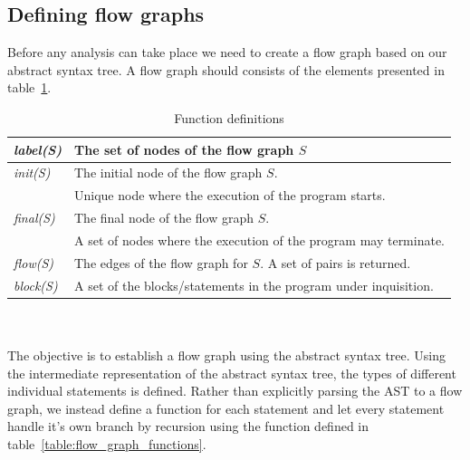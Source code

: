 \subsection{Defining flow graphs}\label{section:CreatingFlowGraphs}
Before any analysis can take place we need to create a flow graph based on our abstract syntax tree. A flow graph should consists of the elements presented in table~\ref{table:flow_graph_definitions}.
\begin{table}
    \begin{tabular}{l | l }
    \textsl{label(S)} & The set of nodes of the flow graph $S$ \\
    \hline    
    \textsl{init(S)}  & The initial node of the flow graph $S$.\\
               & Unique node where the execution of the program starts.\\
    \hline
    \textsl{final(S)}   & The final node of the flow graph $S$.\\
                 & A set of nodes where the execution of the program may terminate.\\
    \hline
    \textsl{flow(S)} & The edges of the flow graph for $S$. A set of pairs is returned. \\
	\hline
    \textsl{block(S)}   & A set of the blocks/statements in the program under inquisition.\\
    \end{tabular}
    \centering
	\caption{Function definitions}
	\label{table:flow_graph_definitions}
\end{table}
\\\\
The objective is to establish a flow graph using the abstract syntax tree. Using the intermediate representation of the abstract syntax tree, the types of different individual statements is defined. Rather than explicitly parsing the AST to a flow graph, we instead define a function for each statement and let every statement handle it's own branch by recursion using the function defined in table~\ref{table:flow_graph_functions}.

